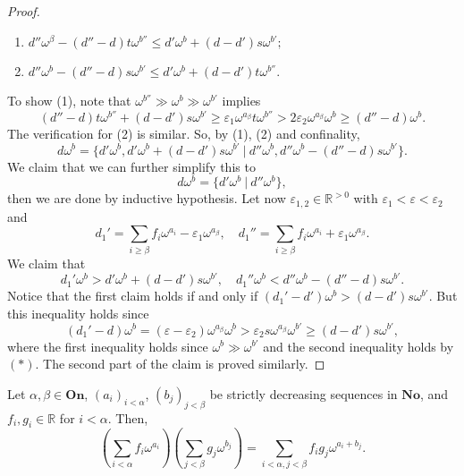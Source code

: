 \begin{proof}
\begin{enumerate}[(1)]
\item $d''\omega^\beta - (d''-d)t\omega^{b''} \leq d'\omega^b + (d-d')s\omega^{b'};$
\item  $d''\omega^b- (d''-d)s\omega^{b'}\leq d'\omega^b + (d-d')t\omega^{b''}$.
\end{enumerate}
To show (1), note that $\omega^{b''}\gg \omega^b\gg \omega^{b'}$ implies
$$(d''-d)t\omega^{b''}+(d-d')s\omega^{b'}\geq \varepsilon_1\omega^{a_\beta}t\omega^{b''} > 2\varepsilon_2 \omega^{a_\beta}\omega^b\geq (d''-d)\omega^b.$$
The verification for (2) is similar.  So, by (1), (2) and confinality, 
$$ d\omega^b =  \{d'\omega^b, d' \omega^b+(d-d')s\omega^{b'}  \ | \
		 d''\omega^b,  d''\omega^b-(d''-d)s\omega^{b'}\}.$$
We claim that we can further simplify this to 
$$d\omega^b=\{d'\omega^b \ | \ d''\omega^b\},$$
then we are done by inductive hypothesis.  Let now $\varepsilon_{1, 2}\in \mathds{R}^{>0}$ with $\varepsilon_1<\varepsilon<\varepsilon_2$ and
$$d_1'= \sum_{i\geq \beta}f_i\omega^{a_i}-\varepsilon_1\omega^{a_\beta}, \quad d_1''=\sum_{i\geq \beta}f_i\omega^{a_i}+\varepsilon_1\omega^{a_\beta}.$$
We claim that 
$$d_1'\omega^b>d'\omega^b+(d-d')s\omega^{b'}, \quad d_1''\omega^b<d''\omega^b-(d''-d)s\omega^{b'}.$$
Notice that the first claim holds if and only if $(d_1'-d')\omega^b>(d-d')s\omega^{b'}$.  But this inequality holds since
$$(d_1'-d)\omega^b= (\varepsilon-\varepsilon_2)\omega^{a_\beta}\omega^b> \varepsilon_2s\omega^{a_\beta}\omega^{b'} \geq (d-d')s\omega^{b'},$$
where the first inequality holds since $\omega^b\gg \omega^{b'}$ and the second inequality holds by $(*)$.  The second part of the claim is proved similarly.
\end{proof}

\begin{proposition} Let $\alpha, \beta \in \textbf{On}$, $(a_i)_{i<\alpha}$, $(b_j)_{j<\beta}$ be strictly decreasing sequences in $\textbf{No}$, and $f_i, g_i\in \mathds{R}$ for $i<\alpha$. Then,
$$\left (\sum_{i<\alpha}f_i\omega^{a_i} \right ) \left ( \sum_{j<\beta}g_j\omega^{b_j} \right ) = \sum_{i<\alpha, j<\beta} f_ig_j \omega^{a_i+b_j}.$$
\end{proposition}

